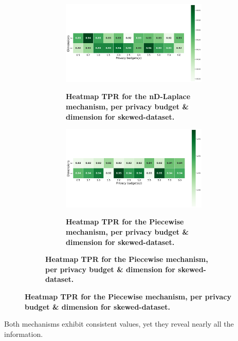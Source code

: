 \begin{figure}[H]
  \centering
  \begin{subfigure}[b]{0.9\textwidth}
    \begin{subfigure}[c]{1\textwidth}
      \caption{\textbf{Heatmap TPR for the nD-Laplace mechanism, per privacy budget \& dimension for skewed-dataset.}}
      \includegraphics[width=1\textwidth]{Results/kd-laplace/kd-Laplace/skewed-dataset/tpr.png}
      \label{fig:privacy_tpr_skewed-dataset_adversial_advantage_kd-laplace}
    \end{subfigure}
    \vfill %

    \begin{subfigure}[c]{1\textwidth}
      \caption{\textbf{Heatmap TPR for the Piecewise mechanism, per privacy budget \& dimension for skewed-dataset.}}
      \includegraphics[width=1\textwidth]{Results/kd-laplace/piecewise/skewed-dataset/tpr.png}
      \label{fig:privacy_tpr_skewed-dataset_adversial_advantage_piecewise}
    \end{subfigure}
  \end{subfigure}
\end{figure}
Both mechanisms exhibit consistent values, yet they reveal nearly all the information.

